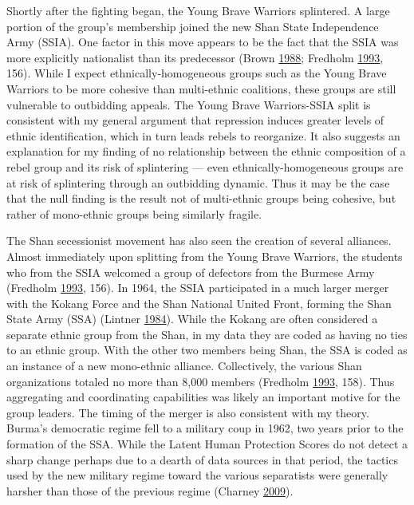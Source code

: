\documentclass[12pt,]{book}
\theoremstyle{definition}
\theoremstyle{definition}
\theoremstyle{remark}
\begin{document}
Shortly after the fighting began, the Young Brave Warriors splintered. A
large portion of the group's membership joined the new Shan State
Independence Army (SSIA). One factor in this move appears to be the fact
that the SSIA was more explicitly nationalist than its predecessor
(Brown \protect\hyperlink{ref-Brown1988a}{1988}; Fredholm
\protect\hyperlink{ref-Fredholm1993}{1993}, 156). While I expect
ethnically-homogeneous groups such as the Young Brave Warriors to be
more cohesive than multi-ethnic coalitions, these groups are still
vulnerable to outbidding appeals. The Young Brave Warriors-SSIA split is
consistent with my general argument that repression induces greater
levels of ethnic identification, which in turn leads rebels to
reorganize. It also suggests an explanation for my finding of no
relationship between the ethnic composition of a rebel group and its
risk of splintering --- even ethnically-homogeneous groups are at risk
of splintering through an outbidding dynamic. Thus it may be the case
that the null finding is the result not of multi-ethnic groups being
cohesive, but rather of mono-ethnic groups being similarly fragile.

The Shan secessionist movement has also seen the creation of several
alliances. Almost immediately upon splitting from the Young Brave
Warriors, the students who from the SSIA welcomed a group of defectors
from the Burmese Army (Fredholm
\protect\hyperlink{ref-Fredholm1993}{1993}, 156). In 1964, the SSIA
participated in a much larger merger with the Kokang Force and the Shan
National United Front, forming the Shan State Army (SSA) (Lintner
\protect\hyperlink{ref-Lintner1984}{1984}). While the Kokang are often
considered a separate ethnic group from the Shan, in my data they are
coded as having no ties to an ethnic group. With the other two members
being Shan, the SSA is coded as an instance of a new mono-ethnic
alliance. Collectively, the various Shan organizations totaled no more
than 8,000 members (Fredholm \protect\hyperlink{ref-Fredholm1993}{1993},
158). Thus aggregating and coordinating capabilities was likely an
important motive for the group leaders. The timing of the merger is also
consistent with my theory. Burma's democratic regime fell to a military
coup in 1962, two years prior to the formation of the SSA. While the
Latent Human Protection Scores do not detect a sharp change perhaps due
to a dearth of data sources in that period, the tactics used by the new
military regime toward the various separatists were generally harsher
than those of the previous regime (Charney
\protect\hyperlink{ref-Charney2009}{2009}).
\end{document}

